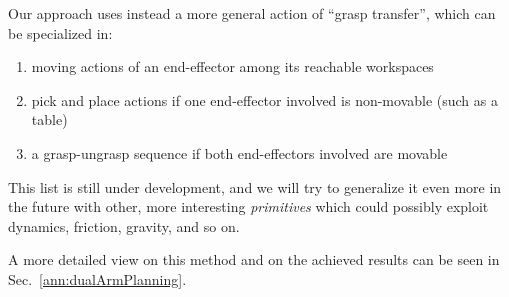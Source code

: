 Our approach uses instead a more general action of ``grasp transfer'', which can be specialized in:
\begin{enumerate}
	\item moving actions of an end-effector among its reachable workspaces
	\item pick and place actions if one end-effector involved is non-movable (such as a table)
	\item a grasp-ungrasp sequence if both end-effectors involved are movable
\end{enumerate}
This list is still under development, and we will try to generalize it even more in the future with other, more interesting \emph{primitives} which could possibly exploit dynamics, friction, gravity, and so on.

A more detailed view on this method and on the achieved results can be seen in Sec.~\ref{ann:dualArmPlanning}. %

